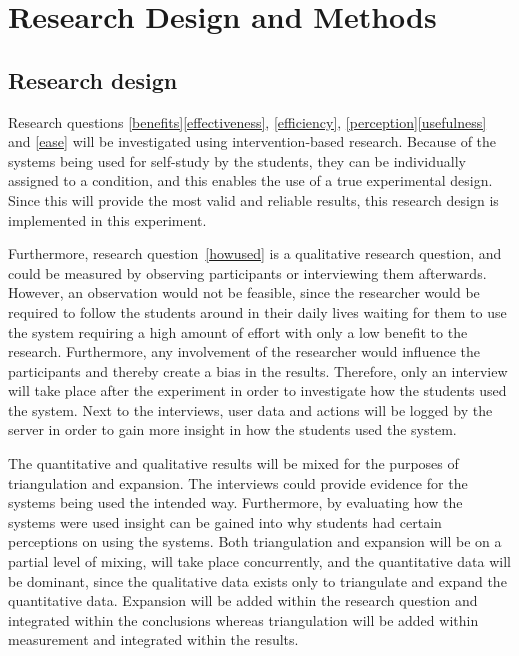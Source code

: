 \chapter{Research Design and Methods}

\section{Research design}


Research questions \ref{benefits}\ref{effectiveness}, \ref{efficiency}, \ref{perception}\ref{usefulness} and \ref{ease} will be investigated using intervention-based research. Because of the systems being used for self-study by the students, they can be individually assigned to a condition, and this enables the use of a true experimental design. Since this will provide the most valid and reliable results, this research design is implemented in this experiment.

Furthermore, research question~\ref{howused} is a qualitative research question, and could be measured by observing participants or interviewing them afterwards. However, an observation would not be feasible, since the researcher would be required to follow the students around in their daily lives waiting for them to use the system requiring a high amount of effort with only a low benefit to the research. Furthermore, any involvement of the researcher would influence the participants and thereby create a bias in the results. Therefore, only an interview will take place after the experiment in order to investigate how the students used the system. Next to the interviews, user data and actions will be logged by the server in order to gain more insight in how the students used the system.

The quantitative and qualitative results will be mixed for the purposes of triangulation and expansion. The interviews could provide evidence for the systems being used the intended way. Furthermore, by evaluating how the systems were used insight can be gained into why students had certain perceptions on using the systems. Both triangulation and expansion will be on a partial level of mixing, will take place concurrently, and the quantitative data will be dominant, since the qualitative data exists only to triangulate and expand the quantitative data. Expansion will be added within the research question and integrated within the conclusions whereas triangulation will be added within measurement and integrated within the results. 

